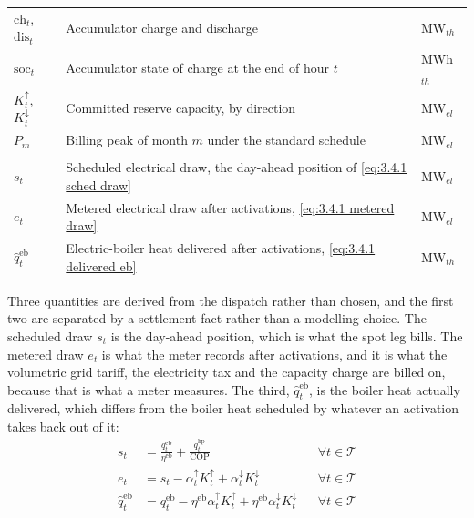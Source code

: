 \begin{table}[!htbp]
\begin{tabular}{p{2.4cm} p{8.9cm} p{2.3cm}}
$\text{ch}_t$, $\text{dis}_t$ & Accumulator charge and discharge & MW$_{th}$ \\
$\text{soc}_t$ & Accumulator state of charge at the end of hour $t$ & MWh$_{th}$ \\
$K^{\uparrow}_t$, $K^{\downarrow}_t$ & Committed reserve capacity, by direction & MW$_{el}$ \\
$P_m$ & Billing peak of month $m$ under the standard schedule & MW$_{el}$ \\ \addlinespace \multicolumn{3}{l}{\textbf{Derived quantities}} \\ $s_t$ & Scheduled electrical draw, the day-ahead position of \autoref{eq:3.4.1 sched draw} & MW$_{el}$ \\ $e_t$ & Metered electrical draw after activations, \autoref{eq:3.4.1 metered draw} & MW$_{el}$ \\ $\hat{q}^{\text{eb}}_t$ & Electric-boiler heat delivered after activations, \autoref{eq:3.4.1 delivered eb} & MW$_{th}$ \\
\bottomrule
\end{tabular}
\label{tab:3.4.1 nomenclature}
\end{table}

Three quantities are derived from the dispatch rather than chosen, and the first two are separated by a settlement fact rather than a modelling choice. The scheduled draw $s_t$ is the day-ahead position, which is what the spot leg bills. The metered draw $e_t$ is what the meter records after activations, and it is what the volumetric grid tariff, the electricity tax and the capacity charge are billed on, because that is what a meter measures. The third, $\hat{q}^{\text{eb}}_t$, is the boiler heat actually delivered, which differs from the boiler heat scheduled by whatever an activation takes back out of it:
\begin{align}
    s_t &= \frac{q^{\text{eb}}_t}{\eta^{\text{eb}}} + \frac{q^{\text{hp}}_t}{\text{COP}} && \forall t \in \mathcal{T} \label{eq:3.4.1 sched draw} \\
    e_t &= s_t - \alpha^{\uparrow}_t K^{\uparrow}_t + \alpha^{\downarrow}_t K^{\downarrow}_t && \forall t \in \mathcal{T} \label{eq:3.4.1 metered draw} \\
    \hat{q}^{\text{eb}}_t &= q^{\text{eb}}_t - \eta^{\text{eb}} \alpha^{\uparrow}_t K^{\uparrow}_t + \eta^{\text{eb}} \alpha^{\downarrow}_t K^{\downarrow}_t && \forall t \in \mathcal{T} \label{eq:3.4.1 delivered eb}
\end{align}

